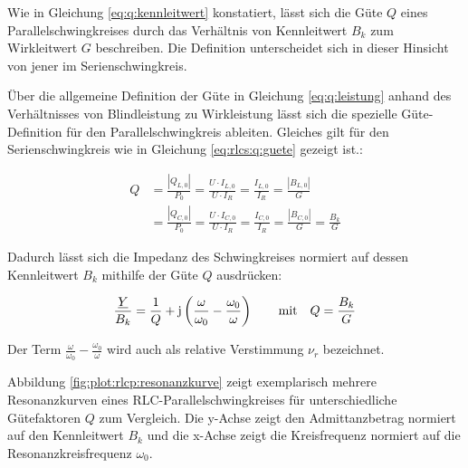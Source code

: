 \begin{frame}
{    Wie in Gleichung \ref{eq:q:kennleitwert} konstatiert, lässt sich die Güte $Q$ eines Parallelschwingkreises 
    durch das Verhältnis von Kennleitwert $B_k$ zum Wirkleitwert $G$ beschreiben. 
    Die Definition unterscheidet sich in dieser Hinsicht von jener im Serienschwingkreis. 

    Über die allgemeine Definition der Güte in Gleichung \ref{eq:q:leistung} anhand des Verhältnisses von Blindleistung zu Wirkleistung
    lässt sich die spezielle Güte-Definition für den Parallelschwingkreis ableiten. 
    Gleiches gilt für den Serienschwingkreis wie in Gleichung \ref{eq:rlcs:q:guete} gezeigt ist.:

    \begin{equation}\label{eq:rlcp:q}
        \begin{aligned}
        Q &= \frac{|Q_{L,0}|}{P_0} = \frac{U \cdot I_{L,0}}{U\cdot I_R} = \frac{I_{L,0}}{I_R} = \frac{|B_{L,0}|}{G}\\
         & = \frac{|Q_{C,0}|}{P_0} = \frac{U \cdot I_{C,0}}{U\cdot I_R} = \frac{I_{C,0}}{I_R} = \frac{|B_{C,0}|}{G} = \frac{B_k}{G}
        \end{aligned}
    \end{equation}

    Dadurch lässt sich die Impedanz des Schwingkreises normiert auf dessen Kennleitwert $B_k$ mithilfe der Güte $Q$ ausdrücken:
    
    \begin{equation}\label{eq:rlcp:ynorm}
        \frac{\underline{Y}}{B_k} = \frac{1}{Q} + \mathrm{j}\left(\frac{\omega}{\omega_0} - \frac{\omega_0}{\omega}\right) \vphantom{\Big|}
        \qquad\text{mit}\quad Q = \frac{B_k}{G}
    \end{equation}
    
    Der Term $\frac{\omega}{\omega_0} - \frac{\omega_0}{\omega}$ wird auch als relative Verstimmung $\nu_r$ bezeichnet.\cite{hagmann}

    Abbildung \ref{fig:plot:rlcp:resonanzkurve} zeigt exemplarisch mehrere Resonanzkurven eines RLC-Parallelschwingkreises für unterschiedliche Gütefaktoren $Q$ zum Vergleich.
    Die y-Achse zeigt den Admittanzbetrag normiert auf den Kennleitwert $B_k$ und die x-Achse zeigt die Kreisfrequenz normiert auf die Resonanzkreisfrequenz $\omega_0$.
    
    
}
\end{frame}
